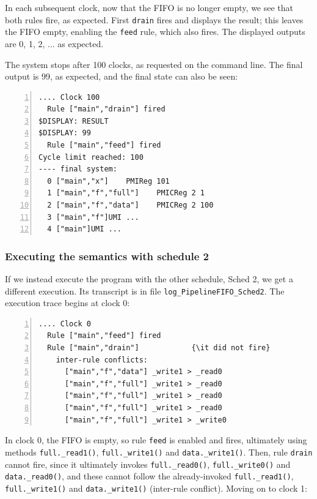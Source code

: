 \documentclass[11pt]{article}
\newcommand{\term}[1]{\texttt{#1}}
\begin{document}
In each subsequent clock, now that the FIFO is no longer empty, we see
that both rules fire, as expected.  First \term{drain} fires and
displays the result; this leaves the FIFO empty, enabling the
\term{feed} rule, which also fires.  The displayed outputs are 0, 1,
2, ... as expected.

The system stops after 100 clocks, as requested on the command line.
The final output is 99, as expected, and the final state can also be
seen:

\begin{Verbatim}[frame=single, numbers=left, commandchars=\\\{\}]
.... Clock 100
  Rule ["main","drain"] fired
$DISPLAY: RESULT
$DISPLAY: 99
  Rule ["main","feed"] fired
Cycle limit reached: 100
---- final system: 
  0 ["main","x"]    PMIReg 101
  1 ["main","f","full"]    PMICReg 2 1
  2 ["main","f","data"]    PMICReg 2 100
  3 ["main","f"]UMI ...
  4 ["main"]UMI ...
\end{Verbatim}


\subsubsection{Executing the semantics with schedule 2}

If we instead execute the program with the other schedule, Sched 2, we
get a different execution.  Its transcript is in file
\verb|log_PipelineFIFO_Sched2|.  The execution trace begins at clock
0:

\begin{Verbatim}[frame=single, numbers=left, commandchars=\\\{\}]
.... Clock 0
  Rule ["main","feed"] fired
  Rule ["main","drain"]            {\it did not fire}
    inter-rule conflicts:
      ["main","f","data"] _write1 > _read0
      ["main","f","full"] _write1 > _read0
      ["main","f","full"] _write1 > _read0
      ["main","f","full"] _write1 > _read0
      ["main","f","full"] _write1 > _write0
\end{Verbatim}

In clock 0, the FIFO is empty, so rule \term{feed} is enabled and
fires, ultimately using methods \verb|full._read1()|,
\verb|full._write1()| and \verb|data._write1()|.  Then, rule
\term{drain} cannot fire, since it ultimately invokes
\verb|full._read0()|, \verb|full._write0()| and \verb|data._read0()|,
and these cannot follow the already-invoked \verb|full._read1()|,
\verb|full._write1()| and \verb|data._write1()| (inter-rule conflict).
Moving on to clock 1:
\end{document}
